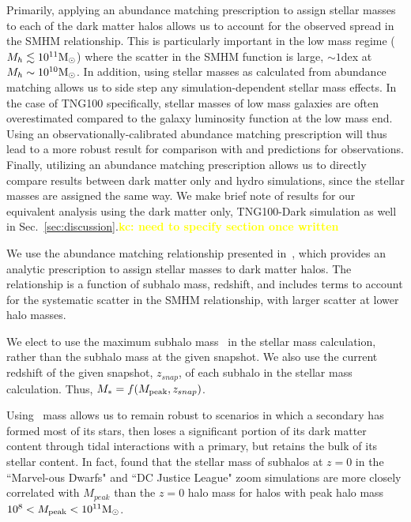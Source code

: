 \documentclass[twocolumn]{aastex631}
\newcommand{\kc}[1]{\textcolor{yellow}{\textbf{kc: #1}} }
\newcommand{\ms}[1]{\ensuremath{M_{*{#1}}}}
\begin{document}
    Primarily, applying an abundance matching prescription to assign stellar masses to each of the dark matter halos allows us to account for the observed spread in the SMHM relationship. 
    This is particularly important in the low mass regime ($M_h \lesssim 10^{11}\mathrm{M}_\odot$) where the scatter in the SMHM function is large, $\sim 1$dex at $M_{h}\sim 10^{10}\mathrm{M}_\odot$. 
    In addition, using stellar masses as calculated from abundance matching allows us to side step any simulation-dependent stellar mass effects.
    In the case of TNG100 specifically, stellar masses of low mass galaxies are often overestimated compared to the galaxy luminosity function at the low mass end\cite{}. 
    Using an observationally-calibrated abundance matching prescription will thus lead to a more robust result for comparison with and predictions for observations. 
    Finally, utilizing an abundance matching prescription allows us to directly compare results between dark matter only and hydro simulations, since the stellar masses are assigned the same way. 
    We make brief note of results for our equivalent analysis using the dark matter only, TNG100-Dark simulation as well in Sec.~\ref{sec:discussion}.\kc{need to specify section once written}
    
    We use the abundance matching relationship presented in~\citet{Moster2013}, which provides an analytic prescription to assign stellar masses to dark matter halos. 
    The~\citet{Moster2013} relationship is a function of subhalo mass, redshift, and includes terms to account for the systematic scatter in the SMHM relationship, with larger scatter at lower halo masses.
    
    We elect to use the maximum subhalo mass \Mpeak\ in the stellar mass calculation, rather than the subhalo mass at the given snapshot.
    We also use the current redshift of the given snapshot, $z_{snap}$, of each subhalo in the stellar mass calculation. 
    Thus, $\ms{}=f(\Mpeak,z_{snap})$. 
    
    Using \Mpeak\ mass allows us to remain robust to scenarios in which a secondary has formed most of its stars, then loses a significant portion of its dark matter content through tidal interactions with a primary, but retains the bulk of its stellar content.
    In fact, \citet{Munshi2021} found that the stellar mass of subhalos at $z=0$ in the ``Marvel-ous Dwarfs" and ``DC Justice League" zoom simulations are more closely correlated with $M_{peak}$ than the $z=0$ halo mass for halos with peak halo mass $10^8<M_{\rm peak}<10^{11} \mathrm{M}_\odot$. 
\end{document}
